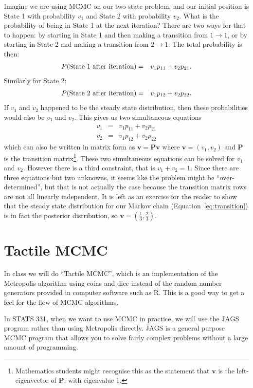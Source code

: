 Imagine we are using MCMC on our two-state problem, and our initial position
is State 1 with probability $v_1$ and State 2 with probability $v_2$. What
is the probability of being in State 1 at the next iteration? There are two
ways for that to happen: by starting in State 1 and then making a transition
from $1\to 1$, or by starting in State 2  and making a transition from $2\to 1$.
The total probability is then:
\begin{eqnarray}
P(\textnormal{State 1 after iteration}) &=& v_1p_{11} + v_2p_{21}.
\end{eqnarray}
Similarly for State 2:
\begin{eqnarray}
P(\textnormal{State 2 after iteration}) &=& v_1p_{12} + v_2p_{22}.
\end{eqnarray}
If $v_1$ and $v_2$ happened to be the steady state distribution, then these
probabilities would also be $v_1$ and $v_2$. This gives us two simultaneous
equations
\begin{eqnarray}
v_1 &=& v_1p_{11} + v_2p_{21}\\
v_2 &=& v_1p_{12} + v_2p_{22}
\end{eqnarray}
which can also be written in matrix form as $\mathbf{v} = \mathbf{P}\mathbf{v}$
where $\mathbf{v} = \left(v_1, v_2\right)$ and $\mathbf{P}$ is the transition
matrix\footnote{Mathematics students might recognise this as the statement
that $\mathbf{v}$ is the left-eigenvector of $\mathbf{P}$, with eigenvalue 1.}.
These two simultaneous equations can be solved for $v_1$ and $v_2$.
However there is a third constraint, that is $v_1 + v_2 = 1$. Since there
are three equations but two unknowns, it seems like the problem might be
``over-determined'', but that is not actually the case because the transition
matrix rows are not all linearly independent.
It is left as an exercise for the reader to show that the steady state
distribution for our Markov chain (Equation~\ref{eq:transition}) is in fact
the posterior distribution, so
$\mathbf{v} = \left(\frac{1}{3}, \frac{2}{3}\right)$.

\section{Tactile MCMC}
In class we will do ``Tactile MCMC'', which is an implementation of the
Metropolis algorithm using coins and dice instead of the random number generators
provided in computer software such as R. This is a good way to get a feel for
the flow of MCMC algorithms.

In STATS 331, when we want to use MCMC in practice, we will use the JAGS program
rather than using Metropolis directly. JAGS is a general purpose MCMC program
that allows you to solve fairly complex problems without a large amount of
programming.
